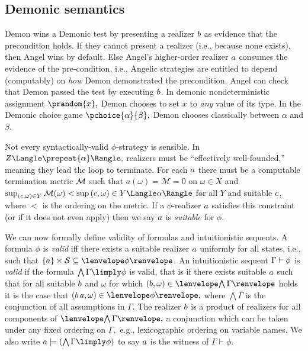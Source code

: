 \documentclass[12pt]{cmuthesis}
\theoremstyle{definition}
\theoremstyle{remark}
\newcommand{\rref}[2][]{\prettyref{#2}}
\newcommand{\allstate}{\mathcal{S}}
\newcommand{\om}{\omega}
\newcommand{\G}{\Gamma}
\begin{document}
\subsection{Demonic semantics}
Demon wins a Demonic test by presenting a realizer $\ab$ as evidence that the precondition holds.
If they cannot present a realizer (i.e., because none exists), then Angel wins by default.
Else Angel's higher-order realizer $\aa$ consumes the evidence of the pre-condition, i.e., Angelic strategies are entitled to depend (computably) on \emph{how} Demon demonstrated the precondition.
Angel can check that Demon passed the test by executing $\ab$.
In demonic nondeterministic assignment $\prandom{x},$ Demon chooses to set $x$ to \emph{any} value of its type.
In the Demonic choice game $\pchoice{\alpha}{\beta},$ Demon chooses classically between $\alpha$ and $\beta$.

Not every syntactically-valid $\phi$-strategy is sensible.
In $\strategyforR[\prepeat{\alpha}]{Z},$ realizers must be ``effectively well-founded,'' meaning they lead the loop to terminate.
For each $\aa$ there must be a computable termination metric $\met$  such that $a(\om) = \mathcal{M}=0$ on $\om \in X$ and 
$\sup_{(\ac,\om) \in Y}\mathcal{M}(\om) < \sup{(\ac,\om) \in \strategyforR[\alpha]{Y}}$ for all $Y$ and suitable $\ac$, where $<$ is the ordering on the metric.
If a $\phi$-realizer $\aa$ satisfies this constraint (or if it does not even apply) then we say $\aa$ is \emph{suitable} for $\phi$.

We can now formally define validity of formulas and intuitionistic sequents.
A formula $\phi$ is \emph{valid} iff there exists a suitable realizer $\aa$ uniformly for all states, i.e., such that  $\{\aa\} \times \allstate \subseteq \fintR{\phi}$.
An intuitionistic sequent $\seq{\G}{\phi}$ is \emph{valid} if the formula $\bigwedge \G \limply \phi$ is valid, 
that is if there exists suitable $\aa$ such that for all suitable $\ab$ and $\om$ for which $(\ab,\om) \in \cintR{\G}$ holds it is the case that
$(\rzApp{\ab}{\aa},\om) \in \fintR{\phi},$ where $\bigwedge \G$ is the conjunction of all assumptions in $\G$.
The realizer $\ab$ is a product of realizers for all components of $\cintR{\G},$ a conjunction which can be taken under any fixed ordering on $\G,$ e.g., lexicographic ordering on variable names.
We also write $\aa \models (\bigwedge \G \limply \phi)$ to say $\aa$ is the witness of $\G \vdash \phi$.
\end{document}
